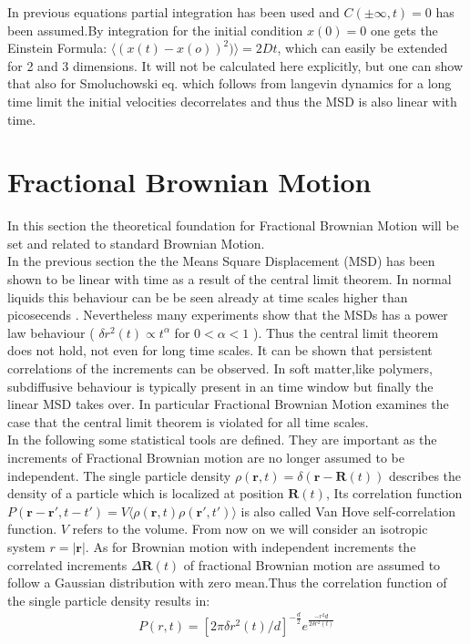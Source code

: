 \documentclass[
  a4paper,BCOR10mm,oneside,
  bibtotoc,idxtotoc,
  headsepline,footsepline,%
  fleqn,openbib
]{scrbook}
\begin{document}
In previous equations partial integration has been used and  $C(\pm \infty,t)=0$ has been assumed.By integration for the initial condition $x(0) = 0$  one gets the Einstein Formula: $\langle (x(t)-x(o))^2)\rangle= 2Dt$, which can easily be extended for 2 and 3 dimensions. It will not be calculated here explicitly, but one can show that also for Smoluchowski eq. which follows from langevin dynamics for a long time limit the initial velocities decorrelates and thus the MSD is also linear with time.

\section{Fractional Brownian Motion}
In this section the theoretical foundation for Fractional Brownian Motion will be set and related to standard Brownian Motion. \\
In the previous section the the Means Square Displacement (MSD) has been shown to be linear with time as a result of the central limit theorem. In normal liquids this behaviour can be be seen already at time scales higher than picosecends \cite{Hofling2013}. Nevertheless many experiments show that the MSDs has a power law behaviour ( $\delta r ^2 (t) \propto t^{\alpha}$ for  $0 < \alpha < 1$ ). Thus the central limit theorem does not hold, not even for long time scales. It can be shown that persistent correlations of the increments can be observed. In soft matter,like polymers, subdiffusive behaviour is typically present in an time window but finally the linear MSD takes over. In particular Fractional Brownian Motion examines the case that the central limit theorem is violated for all time scales.\\
In the following some statistical tools are defined. They are important as the increments of Fractional Brownian motion are no longer assumed to be independent. The single particle density $\rho(\bm{r},t)=\delta(\bm{r}-\bm{R}(t))$ describes the density of a particle which is localized at position $\bm{R}(t)$, Its correlation function $P(\bm{r}-\bm{r}',t-t')= V\langle\rho(\bm{r},t) \rho(\bm{r}',t')\rangle$ is also called Van Hove self-correlation function. $V$ refers to the volume. From now on we will consider an isotropic system $ r= |\bm{r}|$. As for Brownian motion with independent increments the correlated increments  $\Delta\bm{R}(t)$ of fractional Brownian motion are assumed to follow a Gaussian distribution with zero mean.Thus the correlation function of the single particle density results in:
\begin{align}
 P(r,t)=[2 \pi \delta r^{2}(t)/d]^{-\frac{d}{2}} e^{ \frac{-r^2 d}{2 \delta r^{2}(t) }}
\end{align}
\end{document}
